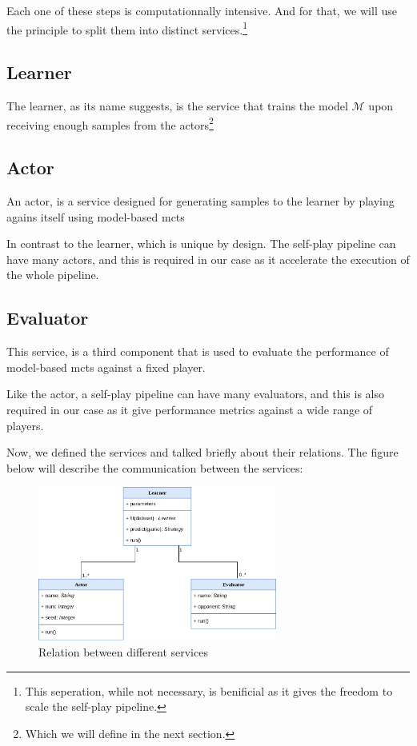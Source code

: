 Each one of these steps is computationnally intensive. And for that, we will use the  principle to split them into distinct services.\footnote{This seperation, while not necessary, is benificial as it gives the freedom to scale the self-play pipeline.}
\subsection{Learner}
The learner, as its name suggests, is the service that trains the model $\mathcal{M}$ upon receiving enough samples from the actors\footnote{Which we will define in the next section.}

\subsection{Actor}
An actor, is a service designed for generating samples to the learner by playing agains itself using model-based \acrshort{mcts}

In contrast to the learner, which is unique by design. The self-play pipeline can have many actors, and this is required in our case as it accelerate the execution of the whole pipeline.

\subsection{Evaluator}
This service, is a third component that is used to evaluate the performance of model-based \acrshort{mcts} against a fixed player.

Like the actor, a self-play pipeline can have many evaluators, and this is also required in our case as it give performance metrics against a wide range of players.

Now, we defined the services and talked briefly about their relations. The figure below will describe the communication between the services:
\begin{figure}[H]
	\centering
	\includegraphics[width=0.7\textwidth]{Figures/ServiceRelations.png}
	\caption{Relation between different services\label{fig:RelationServices}}
\end{figure}
\FloatBarrier


